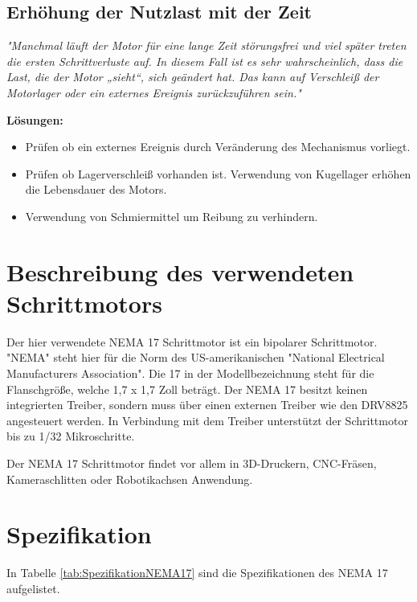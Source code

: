 {{{{{{{				\subsection{Erhöhung der Nutzlast mit der Zeit}
				\textit{"Manchmal läuft der Motor für eine lange Zeit störungsfrei und viel später treten die ersten Schrittverluste auf. In diesem Fall ist es sehr wahrscheinlich, dass die Last, die der Motor „sieht“, sich geändert hat. Das kann auf Verschleiß der Motorlager oder ein externes Ereignis zurückzuführen sein."}\cite{Faulhaber:2020}
				
				\textbf{Lösungen:}
				\begin{itemize}
					\item Prüfen ob ein externes Ereignis durch Veränderung des Mechanismus vorliegt.
					\item Prüfen ob Lagerverschleiß vorhanden ist. Verwendung von Kugellager erhöhen die Lebensdauer des Motors.
					\item Verwendung von Schmiermittel um Reibung zu verhindern.
				\end{itemize}

\section{Beschreibung des verwendeten Schrittmotors}

Der hier verwendete NEMA 17 Schrittmotor ist ein bipolarer Schrittmotor. "NEMA" steht hier für die Norm des US-amerikanischen "National Electrical Manufacturers Association". Die 17 in der Modellbezeichnung steht für die Flanschgröße, welche 1,7 x 1,7 Zoll beträgt. Der NEMA 17 besitzt keinen integrierten Treiber, sondern muss über einen externen Treiber wie den DRV8825 angesteuert werden. In Verbindung mit dem Treiber unterstützt der Schrittmotor bis zu 1/32 Mikroschritte. 

Der NEMA 17 Schrittmotor findet vor allem in 3D-Druckern, CNC-Fräsen, Kameraschlitten oder Robotikachsen Anwendung. \cite{NEMA17}

\section{Spezifikation}

In Tabelle \autoref{tab:SpezifikationNEMA17} sind die Spezifikationen des NEMA 17 aufgelistet. 

}}}}}}}
